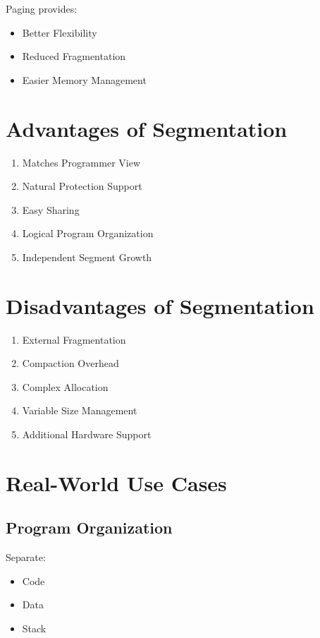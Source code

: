 Paging provides:

\begin{itemize}
\item Better Flexibility
\item Reduced Fragmentation
\item Easier Memory Management
\end{itemize}

\section{Advantages of Segmentation}

\begin{enumerate}
\item Matches Programmer View
\item Natural Protection Support
\item Easy Sharing
\item Logical Program Organization
\item Independent Segment Growth
\end{enumerate}

\section{Disadvantages of Segmentation}

\begin{enumerate}
\item External Fragmentation
\item Compaction Overhead
\item Complex Allocation
\item Variable Size Management
\item Additional Hardware Support
\end{enumerate}

\section{Real-World Use Cases}

\subsection{Program Organization}

Separate:

\begin{itemize}
\item Code
\item Data
\item Stack
\end{itemize}

